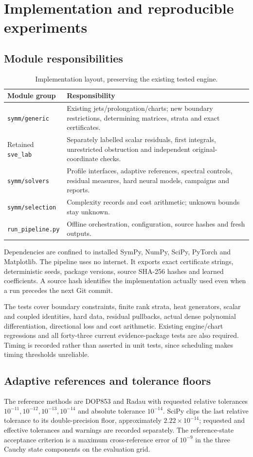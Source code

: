 \documentclass[12pt,a4paper,oneside]{report}
\numberwithin{equation}{chapter}
\DeclareRobustCommand{\code}[1]{\nolinkurl{#1}}
\begin{document}
\chapter{Implementation and reproducible experiments}\label{ch:implementation}
\section{Module responsibilities}
\begin{table}[htbp]
\centering\small
\begin{tabular}{p{}p{}}
\toprule
Module group & Responsibility\\\midrule
\code{symm/generic} & Existing jets/prolongation/charts; new boundary restrictions,
 determining matrices, strata and exact certificates.\\
Retained \code{sve_lab} & Separately labelled scalar residuals, first integrals,
 unrestricted obstruction and independent original-coordinate checks.\\
\code{symm/solvers} & Profile interfaces, adaptive references, spectral controls,
 residual measures, hard neural models, campaigns and reports.\\
\code{symm/selection} & Complexity records and cost arithmetic; unknown bounds stay unknown.\\
\code{run_pipeline.py} & Offline orchestration, configuration, source hashes and fresh outputs.\\
\bottomrule
\end{tabular}
\caption{Implementation layout, preserving the existing tested engine.}
\label{tab:modules}
\end{table}
Dependencies are confined to installed SymPy, NumPy, SciPy, PyTorch and
Matplotlib. The pipeline uses no internet. It exports exact certificate
strings, deterministic seeds, package versions, source SHA-256 hashes and
learned coefficients. A source hash identifies the implementation actually
used even when a run precedes the next Git commit.

The tests cover boundary constraints, finite rank strata, heat generators,
scalar and coupled identities, hard data, residual pullbacks, actual dense
polynomial differentiation, directional loss and cost arithmetic. Existing
engine/chart regressions and all forty-three current evidence-package tests
are also required. Timing is recorded rather than asserted in unit tests,
since scheduling makes timing thresholds unreliable.

\section{Adaptive references and tolerance floors}
The reference methods are DOP853 and Radau with requested relative tolerances
$10^{-11},10^{-12},10^{-13},10^{-14}$ and absolute tolerance $10^{-14}$.
SciPy clips the last relative tolerance to its double-precision floor,
approximately $2.22\times10^{-14}$; requested and effective tolerances and
warnings are recorded separately. The reference-state acceptance criterion
is a maximum cross-reference error of $10^{-9}$ in the three Cauchy state
components on the evaluation grid.
\end{document}
